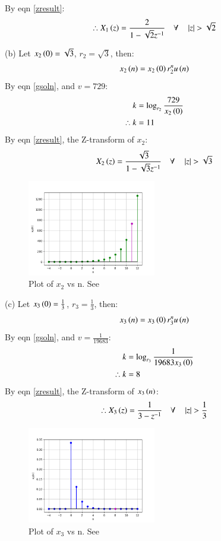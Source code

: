 \documentclass[journal,12pt,twocolumn]{IEEEtran}
\theoremstyle{remark}
\begin{document}
By eqn \ref{zresult}:
\begin{align}
	\therefore X_1\left(z\right) = \frac{2}{1 - \sqrt{2}z^{-1}} \quad \forall \quad \left\vert z\right\vert > \sqrt{2}
\end{align}

(b) Let $x_2\left(0\right) = \sqrt{3}$, $r_2 = \sqrt{3}$, then:
\begin{align}
    x_2\left(n\right) = x_2\left(0\right) r_2^nu\left(n\right)
\end{align}
By eqn \ref{gsoln},  and $v = 729$:
\begin{align}
    k &= \log_{r_2}{\frac{729}{x_2\left(0\right)}} \\
    \therefore k &= 11
\end{align}
By eqn \ref{zresult}, the Z-transform of $x_2$:
\begin{align}
    X_2\left(z\right) = \frac{\sqrt{3}}{1 - \sqrt{3}z^{-1}} \quad \forall \quad \left\vert z\right\vert > \sqrt{3} 
\end{align}

\begin{figure}[h!]
    \renewcommand\thefigure{2}
    \centering
    \includegraphics[width=0.5\textwidth]{figs/b.png}
    \caption[short]{Plot of $x_2$ vs n. See }
    \label{fig:img2}
\end{figure}

(c) Let $x_3\left(0\right) = \frac{1}{3}$, $r_3 = \frac{1}{3}$, then:
\begin{align}
    x_3\left(n\right) = x_3\left(0\right) r_3^nu\left(n\right)
\end{align}
By eqn \ref{gsoln},  and $v = \frac{1}{19683}$:
\begin{align}
    k &= \log_{r_3}{\frac{1}{19683 x_3\left(0\right)}} \\
    \therefore k &= 8
\end{align}
By eqn \ref{zresult}, the Z-transform of $x_3\left(n\right)$:
\begin{align}
    \therefore X_3\left(z\right) = \frac{1}{3 - z^{-1}} \quad \forall \quad \left\vert z\right\vert > \frac{1}{3}
\end{align}

\begin{figure}[h!]
    \renewcommand\thefigure{3}
    \centering
    \includegraphics[width=0.5\textwidth]{figs/c.png}
    \caption[short]{Plot of $x_3$ vs n. See }
    \label{fig:img3}
\end{figure}


\end{document}
